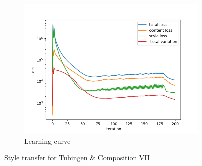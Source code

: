 \documentclass[12pt]{article}
\begin{document}
\begin{figure}[htbp]
\begin{subfigure}[t]{0.48\textwidth}
        \centering
        \includegraphics[trim={3in 0in 3in 0in},scale=0.5]{./Homework2/output/hw2p2_fig13.png}
        \caption{Learning curve}
    \label{hw2p2e}
    \end{subfigure}
    \caption{Style transfer for Tubingen \& Composition VII}
\end{figure}
\end{document}
